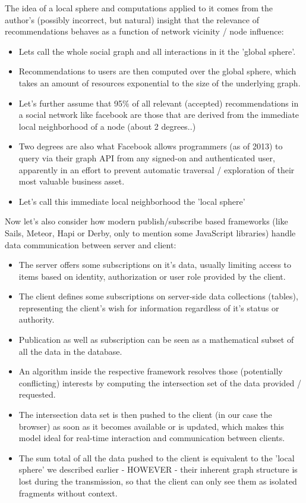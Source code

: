 	The idea of a local sphere and computations applied to it comes from the author's (possibly incorrect, but natural) insight that the relevance of recommendations behaves as a function of network vicinity / node influence:
	
	\begin{itemize}
		\item Lets call the whole social graph and all interactions in it the 'global sphere'.
		\item Recommendations to users are then computed over the global sphere, which takes an amount of resources exponential to the size of the underlying graph.
		\item Let's further assume that 95\% of all relevant (accepted) recommendations in a social network like facebook are those that are derived from the immediate local neighborhood of a node (about 2 degrees..)
		\item Two degrees are also what Facebook allows programmers (as of 2013) to query via their graph API from any signed-on and authenticated user, apparently in an effort to prevent automatic traversal / exploration of their most valuable business asset.
		\item Let's call this immediate local neighborhood the 'local sphere'
	\end{itemize}
		
	Now let's also consider how modern publish/subscribe based frameworks (like Sails, Meteor, Hapi or Derby, only to mention some JavaScript libraries) handle data communication between server and client:
	
	\begin{itemize}
		\item The server offers some subscriptions on it's data, usually limiting access to items based on identity, authorization or user role provided by the client.
		\item The client defines some subscriptions on server-side data collections (tables), representing the client's wish for information regardless of it's status or authority.
		\item Publication as well as subscription can be seen as a mathematical subset of all the data in the database.
		\item An algorithm inside the respective framework resolves those (potentially conflicting) interests by computing the intersection set of the data provided / requested.
		\item The intersection data set is then pushed to the client (in our case the browser) as soon as it becomes available or is updated, which makes this model ideal for real-time interaction and communication between clients.
		\item The sum total of all the data pushed to the client is equivalent to the 'local sphere' we described earlier - HOWEVER - their inherent graph structure is lost during the transmission, so that the client can only see them as isolated fragments without context.
	\end{itemize}
	
